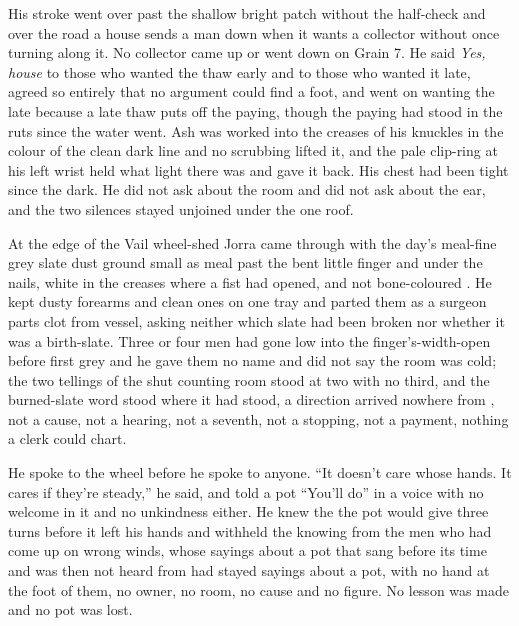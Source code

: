 His stroke went over  past the shallow bright patch without the half-check and over the road a house sends a man down when it wants a collector without once turning along it. No collector came up or went down  on Grain 7. He said \emph{Yes, house} to those who wanted the thaw early and to those who wanted it late, agreed so entirely that no argument could find a foot, and went on wanting the late because a late thaw puts off the paying, though the paying had stood in the ruts since the water went. Ash was worked into the creases of his knuckles in the colour of the clean dark line and no scrubbing lifted it, and the pale clip-ring at his left wrist held what light there was and gave it back. His chest had been tight since the dark. He did not ask about the room and  did not ask about the ear, and the two silences stayed unjoined under the one roof.

\scenebreak

At the edge of the Vail wheel-shed Jorra came through with the day's meal-fine grey slate dust ground small as meal past the bent little finger and under the nails, white in the creases where a fist had opened, and not bone-coloured . He kept dusty forearms and clean ones on one tray and parted them as a surgeon parts clot from vessel, asking neither which slate had been broken nor whether it was a birth-slate. Three or four men had gone low into the finger's-width-open  before first grey and he gave them no name and did not say the room was cold; the two tellings of the shut counting room stood at two with no third, and the burned-slate word stood where it had stood, a direction arrived nowhere from , not a cause, not a hearing, not a seventh, not a stopping, not a payment, nothing a clerk could chart.

He spoke to the wheel before he spoke to anyone. “It doesn't care whose hands. It cares if they're steady,” he said, and told a pot “You'll do” in a voice with no welcome in it and no unkindness either. He knew the  the pot would give three turns before it left his hands and withheld the knowing from the men who had come up on wrong winds, whose sayings about a pot that sang before its time and was then not heard from had stayed sayings about a pot, with no hand at the foot of them, no owner, no room, no cause and no figure. No lesson was made and no pot was lost.

